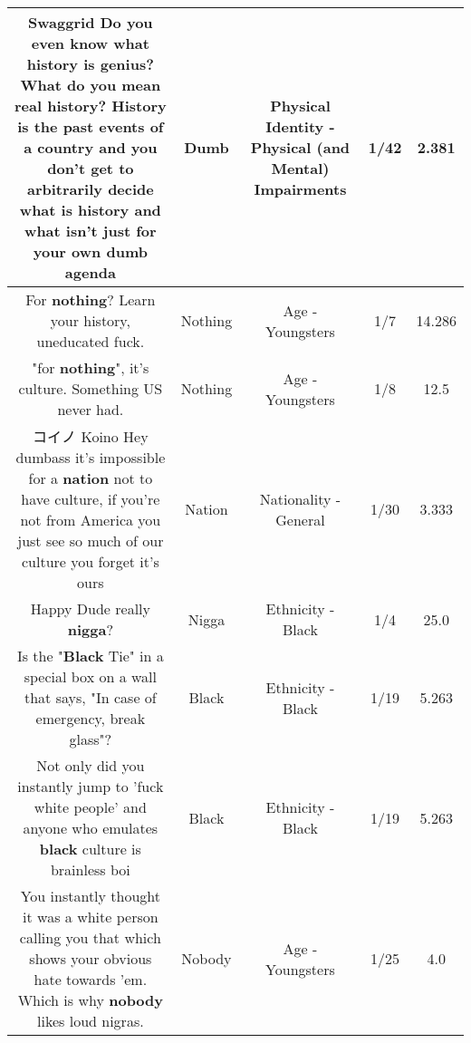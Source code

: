 \documentclass[11pt]{article}
\newlength\mylength
\begin{document}
\begin{center}
\begin{longtable}{|C{.65\mylength}|C{.30\mylength}|C{.12\mylength}|C{.12\mylength}|C{.12\mylength}|}
  \small Swaggrid Do you even know what history is genius? What do you mean real history? History is the past events of a country and you don't get to arbitrarily decide what is history and what isn't just for your own \textbf{dumb} agenda\normalsize   & Dumb & Physical Identity - Physical (and Mental) Impairments & 1/42 & 2.381 \\  \hline
  \small For \textbf{nothing}? Learn your history, uneducated fuck.\normalsize   & Nothing & Age - Youngsters & 1/7 & 14.286 \\  \hline
  \small "for \textbf{nothing}", it's culture. Something US never had.\normalsize   & Nothing & Age - Youngsters & 1/8 & 12.5 \\  \hline
  \small コイノ Koino Hey dumbass it's impossible for a \textbf{nation} not to have culture, if you're not from America you just see so much of our culture you forget it's ours\normalsize   & Nation & Nationality - General & 1/30 & 3.333 \\  \hline
  \small Happy Dude really \textbf{nigga}?\normalsize   & Nigga & Ethnicity - Black & 1/4 & 25.0 \\  \hline
  \small Is the "\textbf{Black} Tie" in a special box on a wall that says, "In case of emergency, break glass"?\normalsize   & Black & Ethnicity - Black & 1/19 & 5.263 \\  \hline
  \small Not only did you instantly jump to 'fuck white people' and anyone who emulates \textbf{black} culture is brainless boi\normalsize   & Black & Ethnicity - Black & 1/19 & 5.263 \\  \hline
  \small You instantly thought it was a white person calling you that which shows your obvious hate towards 'em. Which is why \textbf{nobody} likes loud nigras.\normalsize   & Nobody & Age - Youngsters & 1/25 & 4.0 \\  \hline

\end{longtable}
\end{center}
\end{document}
